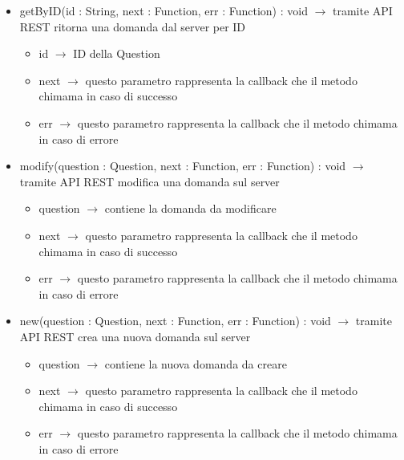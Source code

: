 \begin{description}
\begin{itemize}
	\item getByID(id : String, next : Function, err : Function) : void $\rightarrow$ tramite API REST ritorna una domanda dal server per ID\begin{itemize}
		\item id $\rightarrow$ ID della Question
		\item next $\rightarrow$ questo parametro rappresenta la callback che il metodo chimama in caso di successo
		\item err $\rightarrow$ questo parametro rappresenta la callback che il metodo chimama in caso di errore
	\end{itemize}
	
	\item modify(question : Question, next : Function, err : Function) : void $\rightarrow$ tramite API REST modifica una domanda sul server\begin{itemize}
		\item question $\rightarrow$ contiene la domanda da modificare
		\item next $\rightarrow$ questo parametro rappresenta la callback che il metodo chimama in caso di successo
		\item err $\rightarrow$ questo parametro rappresenta la callback che il metodo chimama in caso di errore
	\end{itemize}
	
	\item new(question : Question, next : Function, err : Function) : void $\rightarrow$ tramite API REST crea una nuova domanda sul server\begin{itemize}
		\item question $\rightarrow$ contiene la nuova domanda da creare
		\item next $\rightarrow$ questo parametro rappresenta la callback che il metodo chimama in caso di successo
		\item err $\rightarrow$ questo parametro rappresenta la callback che il metodo chimama in caso di errore
	\end{itemize}
	
\end{itemize}

\end{description}

